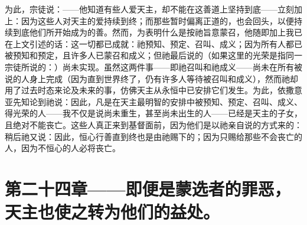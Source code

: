 为此，宗徒说：——他知道有些人爱天主，却不能在这善道上坚持到底——立刻加上：因为这些人对天主的爱持续到终；而那些暂时偏离正道的，也会回头，以便持续到底他们所开始成为的善。然而，为表明什么是按祂旨意蒙召，他随即加上我已在上文引述的话：这一切都已成就：祂预知、预定、召叫、成义；因为所有人都已被预知和预定，且许多人已蒙召和成义；但祂最后说的（如果这里的光荣是指同一宗徒所说的：）尚未实现。虽然这两件事——即祂召叫和祂成义——尚未在所有被说的人身上完成（因为直到世界终了，仍有许多人等待被召叫和成义），然而祂却用了过去时态来论及未来的事，仿佛天主从永恒中已安排它们发生。为此，依撒意亚先知论到祂说：因此，凡是在天主最明智的安排中被预知、预定、召叫、成义、得光荣的人——我不仅是说尚未重生，甚至尚未出生的人——已经是天主的子女，且绝对不能丧亡。这些人真正来到基督面前，因为他们是以祂亲自说的方式来的：稍后祂又说：因此，恒心行善直到终也是由祂赐下的；因为只赐给那些不会丧亡的人，因为不恒心的人必将丧亡。\par


\section{第二十四章——即便是蒙选者的罪恶，天主也使之转为他们的益处。}

